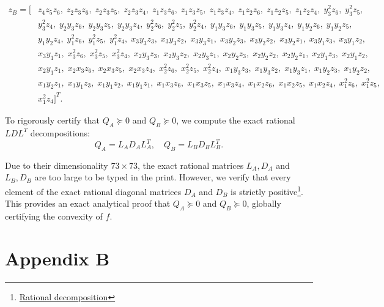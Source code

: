 \documentclass[12pt]{elsarticle}
\theoremstyle{definition}
\begin{document}
\begin{align*}
    z_B = [& z_4 z_5 z_6,\; z_2 z_3 z_6,\; z_2 z_3 z_5,\; z_2 z_3 z_4,\; z_1 z_3 z_6,\; z_1 z_3 z_5,\; z_1 z_3 z_4,\; z_1 z_2 z_6,\; z_1 z_2 z_5,\; z_1 z_2 z_4,\; y_3^2 z_6,\; y_3^2 z_5,\\
    & y_3^2 z_4,\; y_2 y_3 z_6,\; y_2 y_3 z_5,\; y_2 y_3 z_4,\; y_2^2 z_6,\; y_2^2 z_5,\; y_2^2 z_4,\; y_1 y_3 z_6,\; y_1 y_3 z_5,\; y_1 y_3 z_4,\; y_1 y_2 z_6,\; y_1 y_2 z_5,\\
    & y_1 y_2 z_4,\; y_1^2 z_6,\; y_1^2 z_5,\; y_1^2 z_4,\; x_3 y_3 z_3,\; x_3 y_3 z_2,\; x_3 y_3 z_1,\; x_3 y_2 z_3,\; x_3 y_2 z_2,\; x_3 y_2 z_1,\; x_3 y_1 z_3,\; x_3 y_1 z_2,\\
    & x_3 y_1 z_1,\; x_3^2 z_6,\; x_3^2 z_5,\; x_3^2 z_4,\; x_2 y_3 z_3,\; x_2 y_3 z_2,\; x_2 y_3 z_1,\; x_2 y_2 z_3,\; x_2 y_2 z_2,\; x_2 y_2 z_1,\; x_2 y_1 z_3,\; x_2 y_1 z_2,\\
    & x_2 y_1 z_1,\; x_2 x_3 z_6,\; x_2 x_3 z_5,\; x_2 x_3 z_4,\; x_2^2 z_6,\; x_2^2 z_5,\; x_2^2 z_4,\; x_1 y_3 z_3,\; x_1 y_3 z_2,\; x_1 y_3 z_1,\; x_1 y_2 z_3,\; x_1 y_2 z_2,\\
    & x_1 y_2 z_1,\; x_1 y_1 z_3,\; x_1 y_1 z_2,\; x_1 y_1 z_1,\; x_1 x_3 z_6,\; x_1 x_3 z_5,\; x_1 x_3 z_4,\; x_1 x_2 z_6,\; x_1 x_2 z_5,\; x_1 x_2 z_4,\; x_1^2 z_6,\; x_1^2 z_5,\\
    & x_1^2 z_4]^T.
\end{align*}

To rigorously certify that $Q_A \succeq 0$ and $Q_B \succeq 0$, we compute the exact rational $LDL^T$ decompositions:
\begin{equation}
Q_A = L_A D_A L_A^T, \quad Q_B = L_B D_B L_B^T.
\end{equation}

Due to their dimensionality $73 \times 73$, the exact rational matrices $L_A, D_A$ and $L_B, D_B$ are too large to be typed in the print. However, we verify that every element of the exact rational diagonal matrices $D_A$ and $D_B$ is strictly positive\footnote{\href{https://colab.research.google.com/drive/1cx1uTwxm6uVLFumnlWa1yuK71x3BMLEu\#scrollTo=eVVM-Uc0xZ8g}{Rational decomposition}}. This provides an exact analytical proof that $Q_A \succeq 0$ and $Q_B \succeq 0$, globally certifying the convexity of $f$.

\section*{Appendix B}\label{Appendix:B}
\end{document}
